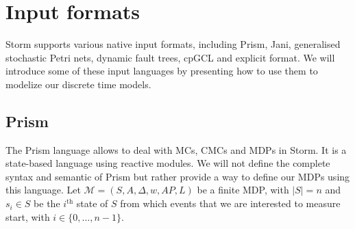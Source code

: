 \section{Input formats}
Storm supports various native input formats, including Prism, Jani, generalised stochastic Petri nets, dynamic fault trees, cpGCL and explicit format.
We will introduce some of these input languages by presenting how to use them to modelize our
discrete time models.
\subsection{Prism}
The Prism language \cite{prismsynt} allows to deal with MCs, CMCs and MDPs in Storm.
It is a state-based language using reactive modules.
We will not define the complete syntax and semantic of Prism but rather provide a way to
define our MDPs using this language.
Let $\mathcal{M} = (S, A, \Delta, w, AP, L)$ be a finite MDP, with $|S| = n$ and $s_i \in S$ be the $i^{\text{th}}$ state of $S$ from which events that we are
interested to measure start, with $i \in \{0, \dots, n-1\}$. \\


